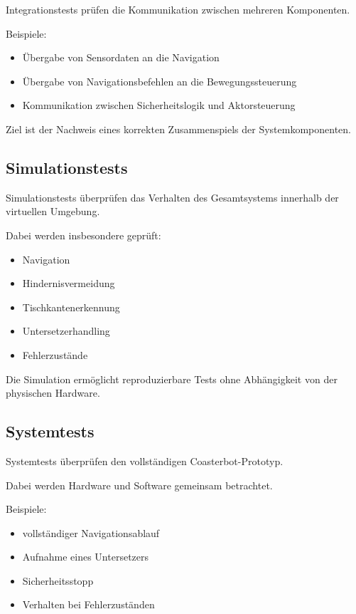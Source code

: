 Integrationstests prüfen die Kommunikation zwischen mehreren
Komponenten.

Beispiele:

\begin{itemize}
\tightlist
\item
  Übergabe von Sensordaten an die Navigation
\item
  Übergabe von Navigationsbefehlen an die Bewegungssteuerung
\item
  Kommunikation zwischen Sicherheitslogik und Aktorsteuerung
\end{itemize}

Ziel ist der Nachweis eines korrekten Zusammenspiels der
Systemkomponenten.

\subsection{Simulationstests}\label{simulationstests}

Simulationstests überprüfen das Verhalten des Gesamtsystems innerhalb
der virtuellen Umgebung.

Dabei werden insbesondere geprüft:

\begin{itemize}
\tightlist
\item
  Navigation
\item
  Hindernisvermeidung
\item
  Tischkantenerkennung
\item
  Untersetzerhandling
\item
  Fehlerzustände
\end{itemize}

Die Simulation ermöglicht reproduzierbare Tests ohne Abhängigkeit von
der physischen Hardware.

\subsection{Systemtests}\label{systemtests}

Systemtests überprüfen den vollständigen Coasterbot-Prototyp.

Dabei werden Hardware und Software gemeinsam betrachtet.

Beispiele:

\begin{itemize}
\tightlist
\item
  vollständiger Navigationsablauf
\item
  Aufnahme eines Untersetzers
\item
  Sicherheitsstopp
\item
  Verhalten bei Fehlerzuständen
\end{itemize}

